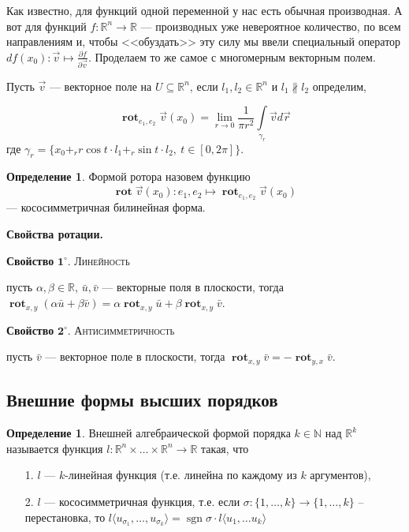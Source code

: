 \documentclass[a5paper]{article}
\newcounter{through}
\theoremstyle{plain}
\theoremstyle{definition}
\newtheorem{definition}[through]{Определение}
\numberwithin{through}{section}
\numberwithin{equation}{section}
\DeclareMathOperator{\sgn}{sgn}
\DeclareMathOperator{\rot}{\textbf{rot}}
\begin{document}
Как известно, для функций одной переменной у нас есть обычная производная. А вот для функций
$f : \mathbb{R}^n \to \mathbb{R}$ --- производных уже невероятное количество, по всем направлениям и, чтобы
<<обуздать>> эту силу мы ввели специальный оператор $df(x_0) : \vec{v} \mapsto \frac{\partial f}{\partial \vec{v}}$.
Проделаем то же самое с многомерным векторным полем.

Пусть $\vec{v}$ --- векторное поле на $U \subseteq \mathbb{R}^n$, если $l_1, l_2 \in \mathbb{R}^n$ и 
$l_1 \nparallel l_2$ определим,

\[ \rot_{e_1, e_2} \vec{v}(x_0) = \lim\limits_{r \to 0} \frac{1}{\pi r^2} \int\limits_{\gamma_r}
\vec{v} d\vec{r} \]
где $\gamma_r = \{ x_0 +_r r\cos t\cdot l_1 +_r \sin t\cdot l_2,\ t \in [0, 2\pi] \}$.

\begin{definition}
	Формой ротора назовем функцию
	\[ \rot \vec{v}(x_0) : e_1, e_2 \mapsto \rot_{e_1, e_2} \vec{v}(x_0) \]
	--- кососимметричная билинейная форма.
\end{definition}

{\bf Свойства ротации.}

\medskip
{\bf Свойство} $\mathbf{1^\circ.}$
{\textsc{Линейность}}

 пусть $\alpha, \beta \in \mathbb{R}$, $\bar{u}, \bar{v}$ --- векторные поля в плоскости,
	тогда
	$\rot_{x, y} (\alpha\bar{u} + \beta\bar{v}) = \alpha\rot_{x,y} \bar{u} + \beta\rot_{x, y} \bar{v}$.
	
\medskip
{\bf Свойство} $\mathbf{2^\circ.}$
{\textsc{Антисимметричность}}

	пусть $\bar{v}$ --- векторное поле в плоскости,
	тогда $\rot_{x,y} \bar{v} = - \rot_{y, x} \bar{v}$.
	






\subsection{Внешние формы высших порядков}

\begin{definition}
	Внешней алгебраической формой порядка $k \in \mathbb{N}$ над $\mathbb{R}^k$ называется функция 
	$l : \mathbb{R}^n \times \ldots \times \mathbb{R}^n \to \mathbb{R}$ такая, что 
	\begin{itemize}
		\item[1.]
		$l$ --- $k$-линейная функция (т.е. линейна по каждому из $k$ аргументов),
		
		\item[2.]
		$l$ --- кососимметричная функция, т.е. если $\sigma: \{ 1,\ldots,k \} \to \{ 1,\ldots,k \}$ -- перестановка, то
		$l\langle u_{\sigma_1},\ldots, u_{\sigma_k} \rangle = \sgn \sigma\cdot l\langle u_1, \ldots u_k \rangle$
	\end{itemize}
\end{definition}
\end{document}
